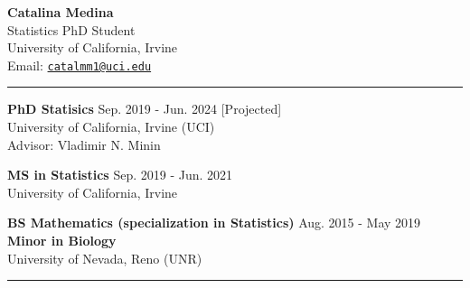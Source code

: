 \documentclass{article}
\makeatletter
\newcommand{\myname}{Catalina Medina}
\newcommand{\myemail}{catalmm1@uci.edu}
\newcommand{\myhomeaddress}{Statistics PhD Student\\ %
	 University of California, Irvine \\ 
	 Email: \texttt{\href{mailto:\myemail}{\myemail}}
 }
\makeatother
\begin{document}
\thispagestyle{empty}
\phantom{.}\vspace{-2cm}
\begin{center}
	{\huge \bf \myname}\\
	\myhomeaddress
\end{center}

\vspace{-4mm}
\rule{\linewidth}{1pt}


\begin{description}
	\vspace{-2mm}
	\item[Education]\hspace*{.1in}
	
		\textbf{PhD Statisics} \hfill{Sep. 2019 - Jun. 2024 [Projected]} \\
		University of California, Irvine (UCI)\\ 
		Advisor: Vladimir N. Minin
		\vspace*{1mm}
		
		\textbf{MS in Statistics} \hfill{Sep. 2019 - Jun. 2021}\\
		University of California, Irvine
		\vspace*{1mm}
		
		\textbf{BS Mathematics (specialization in Statistics)} \hfill{Aug. 2015 - May 2019} \\
		\textbf{Minor in Biology}\\
		University of Nevada, Reno (UNR)
		
\end{description}
\vspace{-2mm}
\rule{\linewidth}{1pt}
\end{document}
